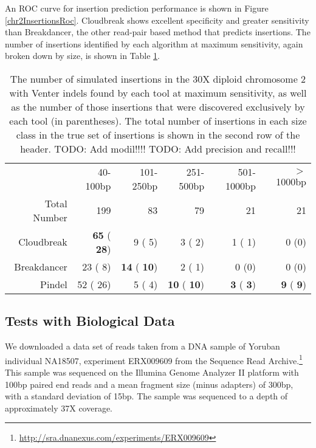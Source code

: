 \documentclass[11pt]{article}
\begin{document}
An ROC curve for insertion prediction performance is shown in Figure \ref{chr2InsertionsRoc}. Cloudbreak shows excellent specificity and greater sensitivity than Breakdancer, the other read-pair based method that predicts insertions. The number of insertions identified by each algorithm at maximum sensitivity, again broken down by size, is shown in Table \ref{chr2InsertionPreds}.

\begin{table}[t]
\begin{center}
\begin{tabular}{rrrrrr}
  \hline
 & 40-100bp  & 101-250bp  & 251-500bp & 501-1000bp & $>$ 1000bp \\ 
 Total Number & 199 &  83 & 79 &  21 & 21\\ 
  \hline
  Cloudbreak  & \textbf{  65} (\textbf{  28})  &    9 (   5) &     3 (   2) &    1 (   1) & 0 (0) \\ 
  Breakdancer &   23 (   8)  & \textbf{  14} (\textbf{  10}) &     2 (   1) & 0 (0) & 0 (0) \\ 
  Pindel      &   52 (  26)  &    5 (   4) &  \textbf{  10} (\textbf{  10}) & \textbf{   3} (\textbf{   3}) & \textbf{   9} (\textbf{   9})\\ 
   \hline
\end{tabular}
\end{center}
\caption{The number of simulated insertions in the 30X diploid chromosome 2 with Venter indels found by each tool at maximum sensitivity, as well as the number of those insertions that were discovered exclusively by each tool (in parentheses). The total number of insertions in each size class in the true set of insertions is shown in the second row of the header. TODO: Add modil!!!! TODO: Add precision and recall!!!}
\label{chr2InsertionPreds}
\end{table}

\subsection{Tests with Biological Data}

We downloaded a data set of reads taken from a DNA sample of Yoruban individual NA18507, experiment ERX009609 from the Sequence Read Archive.\footnote{\url{http://sra.dnanexus.com/experiments/ERX009609}} This sample was sequenced on the Illumina Genome Analyzer II platform with 100bp paired end reads and a mean fragment size (minus adapters) of 300bp, with a standard deviation of 15bp. The sample was sequenced to a depth of approximately 37X coverage.
\end{document}
